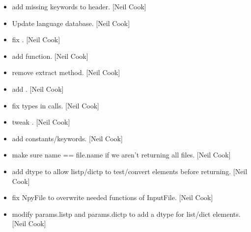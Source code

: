 \documentclass[a4paper,10pt,english]{report}
\begin{document}
\begin{itemize}
\item {} 
 \sphinxhyphen{} add missing keywords to header. {[}Neil Cook{]}

\item {} 
Update language database. {[}Neil Cook{]}

\item {} 
 \sphinxhyphen{} fix . {[}Neil Cook{]}

\item {} 
 \sphinxhyphen{} add  function. {[}Neil Cook{]}

\item {} 
 \sphinxhyphen{} remove extract method. {[}Neil Cook{]}

\item {} 
 \sphinxhyphen{} add . {[}Neil Cook{]}

\item {} 
 \sphinxhyphen{} fix types in calls.
{[}Neil Cook{]}

\item {} 
 \sphinxhyphen{} tweak . {[}Neil Cook{]}

\item {} 
 \sphinxhyphen{} add  constants/keywords. {[}Neil Cook{]}

\item {} 
 \sphinxhyphen{} make sure name == file.name if we aren’t returning
all files. {[}Neil Cook{]}

\item {} 
 \sphinxhyphen{} add dtype to allow listp/dictp to test/convert elements
before returning. {[}Neil Cook{]}

\item {} 
 \sphinxhyphen{} fix NpyFile to overwrite needed functions of InputFile.
{[}Neil Cook{]}

\item {} 
 \sphinxhyphen{} modify params.listp and
params.dictp to add a dtype for list/dict elements. {[}Neil Cook{]}

\end{itemize}
\end{document}

